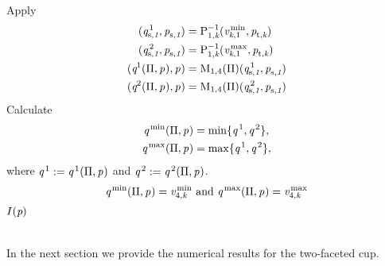 \begin{algorithm}
\begin{algorithmic}[1]
       \Else 
{}
                 \State Apply 
\begin{equation*}
\begin{aligned}
(\textit{q}_{\textrm{s,} \textit{1}}^{\,1}, \textit{p}_{\textrm{s,} \textit{1}})& = \mathrm{P}_{{1,\textit{k}}}^{-1}(\textit{v}_{\textit{k},1 }^\textrm{\,min}, \textit{p}_{\textrm{t,} \textit{\textit{k}}})  \\
(\textit{q}_{\textrm{s,} \textit{1}}^{\,2}, \textit{p}_{\textrm{s,} \textit{1}}) & =\mathrm{P}_{{1,\textit{k}}}^{-1}(\textit{v}_{\textit{k}, 1}^\textrm{\,max}, \textit{p}_{\textrm{t,} \textit{\textit{k}}})\\
(\textit{q}_{\textrm{} \textit{}}^{1}(\Pi, \textit{p}_{\textrm{} \textit{}}), \textit{p}_{\textrm{} \textit{}})&= \mathrm{M}_{1,4}(\Pi)(\textit{q}_{\textrm{s,} \textit{1}}^{\,1}, \textit{p}_{\textrm{s,} \textit{1}})\\
(\textit{q}_{\textrm{} \textit{}}^{2}(\Pi, \textit{p}_{\textrm{} \textit{}}), \textit{p}_{\textrm{} \textit{}})&= \mathrm{M}_{1,4}(\Pi)(\textit{q}_{\textrm{s,} \textit{1}}^{\,2}, \textit{p}_{\textrm{s,} \textit{1}})
\end{aligned}
\end{equation*}
\State Calculate
\begin{equation*}
\begin{aligned}
\textit{q}_{\textrm{} \textit{}}^\textrm{\,min}(\Pi,\textit{p}_{\textrm{} \textit{}})&= \min\{\textit{q}_{\textrm{} \textit{}}^{\,1}, \textit{q}_{\textrm{} \textit{}}^{\,2}\}, \\ 
\textit{q}_{\textrm{} \textit{}}^\textrm{\,max}(\Pi,\textit{p}_{\textrm{} \textit{}})&= \max\{\textit{q}_{\textrm{} \textit{}}^{\,1}, \textit{q}_{\textrm{} \textit{}}^{\,2}\},
\end{aligned}
\end{equation*}
\State where $\textit{q}_{\textrm{} \textit{}}^{\,1} := \textit{q}_{\textrm{} \textit{}}^{\,1}(\Pi, \textit{p}_{\textrm{} \textit{}})$ and $\textit{q}_{\textrm{} \textit{}}^{\,2} := \textit{q}_{\textrm{} \textit{}}^{\,2}(\Pi, \textit{p}_{\textrm{} \textit{}})$.
                 \State{}
                 \Else
                 \begin{equation*}
                       \textit{q}^\textrm{\,min}(\Pi, \textit{p}_{\textrm{} \textit{}}) = \textit{v}_{4, \textit{k}}^\textrm{\,min}\mbox{ and }
                       \textit{q}^\textrm{\,max}(\Pi, \textit{p}_{\textrm{} \textit{}}) = \textit{v}_{4, \textit{k}}^\textrm{\,max}
                       \end{equation*}
                  \State{}
              \EndIf    
\Else \pagebreak
\State \Return $I(\textit{p})$
\EndIf
        \EndIf
     \EndIf
\EndFor
\EndProcedure
\end{algorithmic}
\end{algorithm}
 \\ \indent In the next section we provide the numerical results for the two-faceted cup. 
